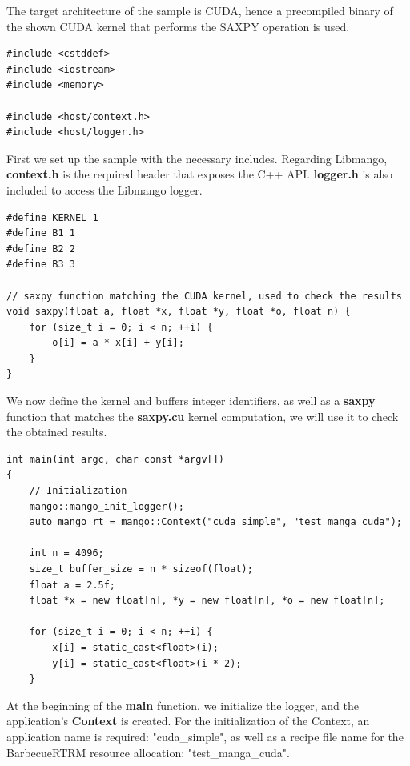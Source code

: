 The target architecture of the sample is CUDA, hence a precompiled binary of the shown CUDA kernel that performs the SAXPY operation is used.

\begin{lstlisting}[style=CStyle, caption=Sample - Includes]
#include <cstddef>
#include <iostream>
#include <memory>

#include <host/context.h>
#include <host/logger.h>
\end{lstlisting}

First we set up the sample with the necessary includes. Regarding Libmango, \textbf{context.h} is the required header that exposes the C++ API. \textbf{logger.h} is also included to access the Libmango logger.

\begin{lstlisting}[style=CStyle, caption=Sample - Definitions]
#define KERNEL 1
#define B1 1
#define B2 2
#define B3 3

// saxpy function matching the CUDA kernel, used to check the results
void saxpy(float a, float *x, float *y, float *o, float n) {
    for (size_t i = 0; i < n; ++i) {
        o[i] = a * x[i] + y[i];
    }
}
\end{lstlisting}

We now define the kernel and buffers integer identifiers, as well as a \textbf{saxpy} function that matches the \textbf{saxpy.cu} kernel computation, we will use it to check the obtained results.

\begin{lstlisting}[style=CStyle, caption=Sample - Initialization]
int main(int argc, char const *argv[])
{
    // Initialization
    mango::mango_init_logger();
    auto mango_rt = mango::Context("cuda_simple", "test_manga_cuda");

    int n = 4096;
    size_t buffer_size = n * sizeof(float);
    float a = 2.5f;
    float *x = new float[n], *y = new float[n], *o = new float[n];

    for (size_t i = 0; i < n; ++i) {
        x[i] = static_cast<float>(i);
        y[i] = static_cast<float>(i * 2);
    }
\end{lstlisting}

At the beginning of the \textbf{main} function, we initialize the logger, and the application's \textbf{Context} is created. For the initialization of the Context, an application name is required: "cuda\_simple", as well as a recipe file name for the BarbecueRTRM resource allocation: "test\_manga\_cuda".

